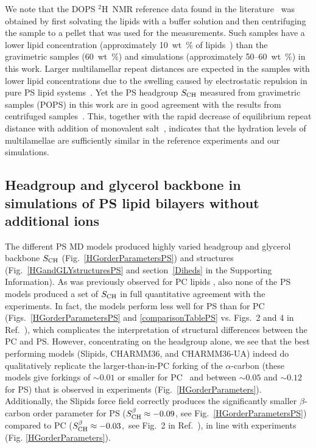 \documentclass[journal=jpcbfk,manuscript=article]{achemso}
\begin{document}
We note that the DOPS $^2$H~NMR reference data found in the literature~\cite{browning80,roux90} was obtained by first solvating
the lipids with a buffer solution and then centrifuging the sample to a pellet that was used for the measurements. Such samples have a lower lipid concentration
(approximately 10~wt~\% of lipids~\cite{browning80,roux88,roux90}) than 
the gravimetric samples (60~wt~\%) and simulations (approximately 50--60~wt~\%) in this work.
Larger multilamellar repeat distances are expected in the samples with lower lipid
concentrations due to the swelling caused by electrostatic repulsion in pure PS lipid systems~\cite{millman82}.
Yet the PS headgroup  $S_{\rm CH}$  measured from gravimetric samples (POPS) in this work
are in good agreement with the results from centrifuged samples~\cite{browning80}. This, together with the rapid decrease of equilibrium repeat distance with addition of monovalent salt~\cite{millman82,rand89}, indicates that the hydration levels of multilamellae are sufficiently similar in the reference experiments and our simulations.

\subsection{Headgroup and glycerol backbone in simulations of PS lipid bilayers without additional ions}

The different PS MD models produced highly varied headgroup and glycerol backbone  $S_{\rm CH}$ (Fig.~\ref{HGorderParametersPS})
and structures (Fig.~\ref{HGandGLYstructuresPS} and section~\ref{Diheds} in the Supporting Information).
As was previously observed for PC lipids \cite{botan15}, also none of the PS models produced a set of  $S_{\rm CH}$ in full quantitative agreement with the experiments.
In fact, the models perform less well for PS than for PC
(Figs.~\ref{HGorderParametersPS} and \ref{comparisonTablePS} vs. Figs.~2 and 4 in Ref.~),
which complicates the interpretation of structural differences between the PC and PS. However, concentrating on the headgroup alone, we see that the best performing models (Slipids, CHARMM36, and CHARMM36-UA) indeed do qualitatively replicate the larger-than-in-PC
forking of the $\alpha$-carbon (these models give forkings of $\sim\!0.01$ or smaller for PC~\cite{botan15} and between $\sim\!0.05$ and $\sim\!0.12$ for PS) that is observed in experiments
(Fig.~\ref{HGorderParameters}).
Additionally, the Slipids force field correctly produces the significantly smaller $\beta$-carbon order parameter
for PS ($S^\beta_{\rm CH}\approx-0.09$, see Fig.~\ref{HGorderParametersPS}) compared to PC ($S^\beta_{\rm CH}\approx-0.03$,~see Fig.~2 in Ref.~),
in line with experiments (Fig. \ref{HGorderParameters}).
\end{document}
